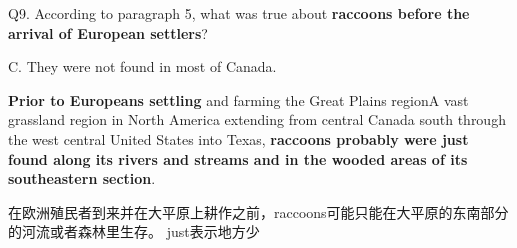 \begin{blk}
    \begin{qst}
        Q9. According to paragraph 5, what was true about \textbf{raccoons before the arrival of European settlers}?
    \end{qst}

    \begin{chc}
        C. They were not found in most of Canada.
    \end{chc}

    \begin{psgq}
        \textbf{Prior to Europeans settling} and farming the Great Plains regionA vast grassland region in North America extending from central Canada south through the west central United States into Texas, \textbf{raccoons probably were just found along its rivers and streams and in the wooded areas of its southeastern section}.
    \end{psgq}

    \begin{nlz}
        在欧洲殖民者到来并在大平原上耕作之前，raccoons可能只能在大平原的东南部分的河流或者森林里生存。 just表示地方少
    \end{nlz}
\end{blk}

